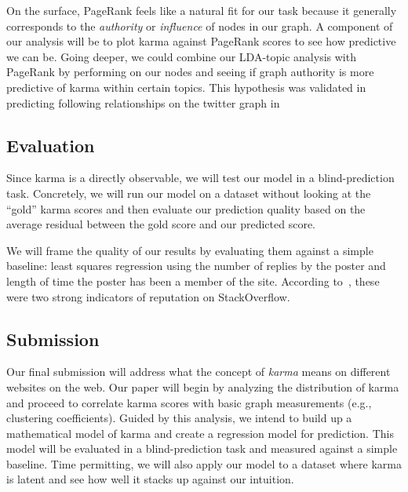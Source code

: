 \documentclass[10pt]{article}
\begin{document}
On the surface, PageRank feels like a natural fit for our task because it
generally corresponds to the \textit{authority} or \textit{influence} of nodes
in our graph. A component of our analysis will be to plot karma against PageRank
scores to see how predictive we can be.  Going deeper, we could combine our
LDA-topic analysis with PageRank by performing \citep{haveliwala2002topic} on 
our nodes and seeing if graph authority is
more predictive of karma within certain topics. This hypothesis was validated in
predicting following relationships on the twitter graph in
\citep{weng2010twitterrank}

\subsection{Evaluation}
Since karma is a directly observable, we will test our model in a
blind-prediction task. Concretely, we will run our model on a dataset without
looking at the ``gold'' karma scores and then evaluate our prediction quality
based on the average residual between the gold score and our predicted score.

We will frame the quality of our results by evaluating them against a simple
baseline: least squares regression using the number of replies by the poster and
length of time the poster has been a member of the site. According
to~\cite{movshovitzanalysis}, these were two strong indicators of reputation on
StackOverflow. 

\subsection{Submission}

Our final submission will address what the concept of \textit{karma} means on
different websites on the web. Our paper will begin by analyzing the
distribution of karma and proceed to correlate karma scores with basic graph
measurements (e.g., clustering coefficients). Guided by this analysis, we intend
to build up a mathematical model of karma and create a regression model for
prediction. This model will be evaluated in a blind-prediction task and measured
against a simple baseline. Time permitting, we will also apply our
model to a dataset where karma is latent and see how well it stacks up
against our intuition.



\end{document}
